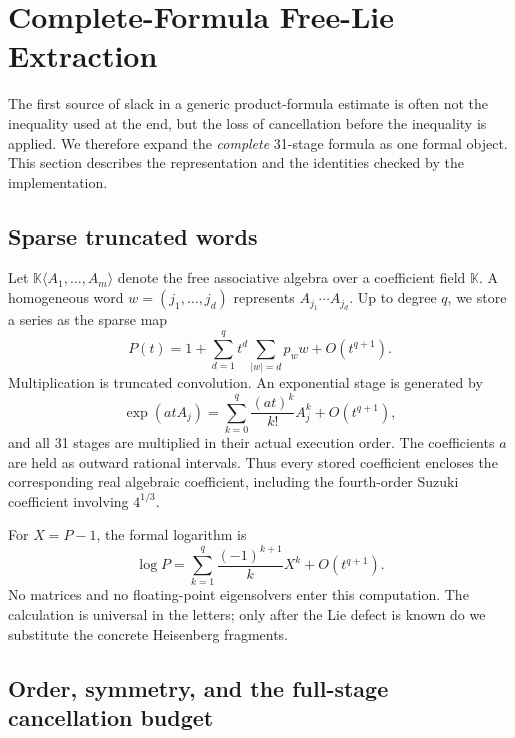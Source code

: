 \section{Complete-Formula Free-Lie Extraction}
\label{sec:free-lie}

The first source of slack in a generic product-formula estimate is often not
the inequality used at the end, but the loss of cancellation before the
inequality is applied.  We therefore expand the \emph{complete} 31-stage
formula as one formal object.  This section describes the representation and
the identities checked by the implementation.

\subsection{Sparse truncated words}

Let $\mathbb{K}\langle A_1,\ldots,A_m\rangle$ denote the free associative
algebra over a coefficient field $\mathbb K$.  A homogeneous word
$w=(j_1,\ldots,j_d)$ represents $A_{j_1}\cdots A_{j_d}$.  Up to degree $q$,
we store a series as the sparse map
\begin{equation}
  P(t)=1+\sum_{d=1}^{q}t^d\sum_{|w|=d}p_w w+O(t^{q+1}).
  \label{eq:sparse-word-series}
\end{equation}
Multiplication is truncated convolution.  An exponential stage is generated
by
\begin{equation}
  \exp(a t A_j)=\sum_{k=0}^{q}\frac{(a t)^k}{k!}A_j^k+O(t^{q+1}),
\end{equation}
and all 31 stages are multiplied in their actual execution order.  The
coefficients $a$ are held as outward rational intervals.  Thus every stored
coefficient encloses the corresponding real algebraic coefficient, including
the fourth-order Suzuki coefficient involving $4^{1/3}$.

For $X=P-1$, the formal logarithm is
\begin{equation}
  \log P=\sum_{k=1}^{q}\frac{(-1)^{k+1}}{k}X^k+O(t^{q+1}).
  \label{eq:formal-log}
\end{equation}
No matrices and no floating-point eigensolvers enter this computation.  The
calculation is universal in the letters; only after the Lie defect is known do
we substitute the concrete Heisenberg fragments.

\subsection{Order, symmetry, and the full-stage cancellation budget}

